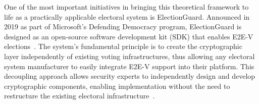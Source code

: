 \documentclass[a4paper,fleqn]{cas-sc}
\begin{document}

One of the most important initiatives in bringing this theoretical framework to life as a practically applicable electoral system is ElectionGuard. Announced in 2019 as part of Microsoft's Defending Democracy program, ElectionGuard is designed as an open-source software development kit (SDK) that enables E2E-V elections~\cite{ElectionGuard2019}. The system's fundamental principle is to create the cryptographic layer independently of existing voting infrastructures, thus allowing any electoral system manufacturer to easily integrate E2E-V support into their platform. This decoupling approach allows security experts to independently design and develop cryptographic components, enabling implementation without the need to restructure the existing electoral infrastructure~\cite{Benaloh2024}.

\end{document}
